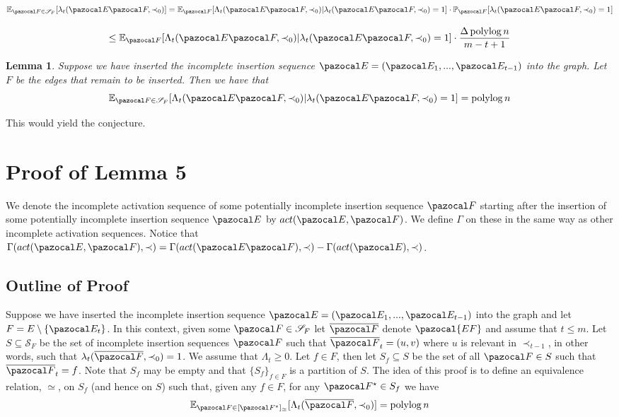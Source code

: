 \documentclass{report}
\newtheorem{lemma}{Lemma}
\DeclareMathOperator*{\polylog}{polylog}
\begin{document}
\[ \mathbb E_{\pazocal F \in \mathcal S_F} [\lambda_t(\pazocal E \pazocal F, \prec_0)]  = \mathbb E_{\pazocal F} [\Lambda_t(\pazocal E \pazocal F, \prec_0) \vert \lambda_t(\pazocal E \pazocal F, \prec_0) = 1] \cdot \mathbb P_{\pazocal F} [\lambda_t(\pazocal E \pazocal F, \prec_0) = 1] \]

\[ \leq \mathbb E_{\pazocal F} [\Lambda_t(\pazocal E \pazocal F, \prec_0) \vert \lambda_t(\pazocal E \pazocal F, \prec_0) = 1] \cdot \frac{\Delta\polylog n}{m-t+1} \]

\begin{lemma} Suppose we have inserted the incomplete insertion sequence $\pazocal E = (\pazocal E_1,...,\pazocal E_{t-1})$ into the graph. Let $F$ be the edges that remain to be inserted. Then we have that
\[ \mathbb E_{\pazocal F \in \mathcal S_F} [\Lambda_t(\pazocal E \pazocal F, \prec_0) \vert \lambda_t(\pazocal E \pazocal F, \prec_0) = 1] = \polylog n\]
\end{lemma}

This would yield the conjecture.

\section{Proof of Lemma 5}

We denote the incomplete activation sequence of some potentially incomplete insertion sequence $\pazocal F$ starting after the insertion of some potentially incomplete insertion sequence $\pazocal E$ by $act(\pazocal E, \pazocal F)$. We define $\Gamma$ on these in the same way as other incomplete activation sequences. Notice that $\Gamma(act(\pazocal E, \pazocal F), \prec) = \Gamma(act(\pazocal E\pazocal F), \prec) - \Gamma(act(\pazocal E), \prec)$.

\subsection{Outline of Proof}

Suppose we have inserted the incomplete insertion sequence $\pazocal E = (\pazocal E_1,...,\pazocal E_{t-1})$ into the graph and let $F=E \setminus \{\pazocal E_t\}$. In this context, given some $\pazocal F \in \mathcal S_F$ let $\overline{\pazocal F}$ denote $\pazocal{EF}$ and assume that $t \leq m$. Let $S \subseteq \mathcal S_F$ be the set of incomplete insertion sequences $\pazocal F$ such that $\overline{\pazocal F}_t=(u,v)$ where $u$ is relevant in $\prec_{t-1}$, in other words, such that $\lambda_t(\overline{\pazocal F}, \prec_0)=1$. We assume that $\Lambda_t \geq 0$. Let $f \in F$, then let $S_f \subseteq S$ be the set of all $\pazocal F \in S$ such that $\overline{\pazocal F}_t = f$. Note that $S_f$ may be empty and that $\{ S_f \}_{f \in F}$ is a partition of $S$. The idea of this proof is to define an equivalence relation, $\simeq$, on $S_f$ (and hence on $S$) such that, given any $f \in F$, for any $\pazocal F^\star \in S_f$ we have
\[ \mathbb E_{\pazocal F \in [\pazocal F^\star]_{\simeq}}[\Lambda_t(\overline{\pazocal F}, \prec_0)] = \polylog n \]
\end{document}
